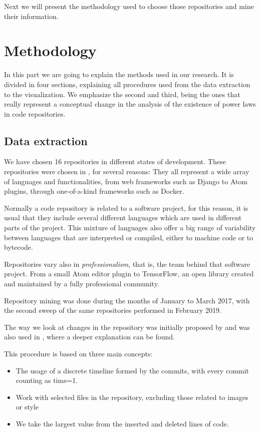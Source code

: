 \documentclass{article}
\begin{document}
Next we will present the methodology used to choose those repositories
and mine their information.




\section{Methodology}
\label{sec:method}

In this part we are going to explain the methods used in our
research. It is divided in four sections, explaining all procedures
used from the data extraction to the visualization. We emphasize the
second and third, being the ones that really represent a conceptual
change in the analysis of the existence of power laws in code
repositories.

\subsection{Data extraction}
We have chosen 16 repositories in different states of development.
These repositories were chosen in \cite{Merelo2016:repomining}, for
several reasons: They all represent a wide array of languages and
functionalities, from web frameworks such as Django to Atom plugins,
through one-of-a-kind frameworks such as Docker.

Normally a code repository is related to a software project, for this
reason, it is usual that they include several different languages
which are used in different parts of the project.  This mixture of
languages also offer a big range of variability between languages that
are interpreted or compiled, either to machine code or to bytecode.

Repositories vary also in {\em professionalism}, that is, the team
behind that software project. From a small Atom editor plugin to
TensorFlow, an open library created and maintained by a fully
professional community.

Repository mining was done during the months of January to March 2017,
with the second sweep of the same repositories performed in February
2019.

The way we look at changes in the repository was initially proposed by
\cite{Merelo2016:repomining} and was also used in
\cite{merelo2017self}, where a deeper explanation can be found.


This procedure is based on three main concepts:
\begin{itemize}
\item The usage of a discrete timeline formed by the commits, with
  every commit counting as time=1.
\item Work with selected files in the repository, excluding those
  related to images or style
\item We take the largest value from the inserted and deleted lines of
  code.
\end{itemize}
\end{document}
